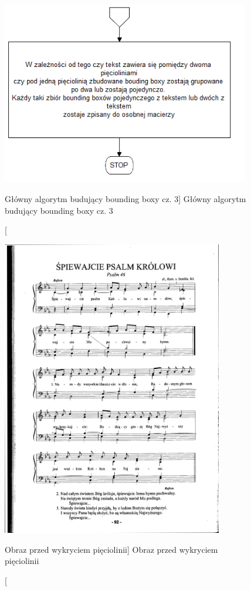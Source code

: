 \documentclass[a4paper,12pt]{article}
\begin{document}
		    \begin{figure}[!ht]  
			    \begin{center}
				    \includegraphics[height=8cm] {image//algorithm//majorProcesing_03.png} 
			    \end{center}
			    \caption
    			    [Główny algorytm budujący bounding boxy cz. 3]
    			    {Główny algorytm budujący bounding boxy cz. 3}  
    			    \label{fig:boundingBox03}
		    \end{figure} 
		
    		\begin{figure}[!ht]  
			    \begin{center}
				    \includegraphics[height=13cm, frame] {image//exampleImage//004_a.png} 
			    \end{center}
			    \caption
    			    [Obraz przed wykryciem pięciolinii]  
    			    {Obraz przed wykryciem pięciolinii}  
		    \end{figure} 
		
\end{document}
